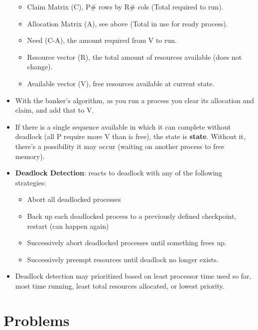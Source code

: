 \documentclass[fontsize=5pt]{scrartcl}
\begin{document}
\begin{multicols}{3}
\begin{itemize}
\begin{itemize}
             \item Claim Matrix (C), P\# rows by R\# cols (Total required to run).
             \item Allocation Matrix (A), see above (Total in use for ready process).
             \item Need (C-A), the amount required from V to run.
             \item Resource vector (R), the total amount of resources available (does not change).
             \item Available vector (V), free resources available at current state.
           \end{itemize}
            \item With the banker's algorithm, as you run a process you clear its allocation and claim, and add that to V.
            \item If there is a single sequence available in which it can complete without deadlock (all P require more V than is free),
                  the state is \textbf{state}. Without it, there's a possibility it may occur (waiting on another process to free memory).
            \item \textbf{Deadlock Detection}: reacts to deadlock with any of the following strategies:
            \begin{itemize}
              \item Abort all deadlocked processes
              \item Back up each deadlocked process to a previously defined checkpoint, restart (can happen again)
              \item Successively abort deadlocked processes until something frees up.
              \item Successively preempt resources until deadlock no longer exists.
            \end{itemize}
            \item Deadlock detection may prioritized based on least processor time used so far, most time running, least total resources allocated, or lowest
                  priority.
            \end{itemize}
            
            
  \section{Problems}

\end{multicols}
\end{document}
